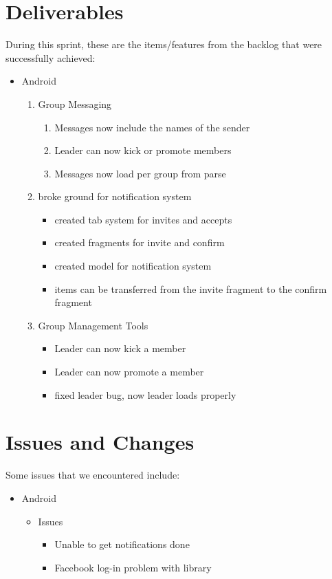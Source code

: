 \documentclass[11pt]{article}
\begin{document}
\section*{Deliverables}
During this sprint, these are the items/features from the backlog that were successfully achieved:
	\begin{itemize}
	\item Android
		\begin{enumerate}
		\item Group Messaging
			\begin{enumerate}
				\item Messages now include the names of the sender
				\item Leader can now kick or promote members
				\item Messages now load per group from parse
			\end{enumerate}
		\item broke ground for notification system
			\begin{itemize}
				\item created tab system for invites and accepts
				\item created fragments for invite and confirm
				\item created model for notification system
				\item items can be transferred from the invite fragment to the confirm fragment
			\end{itemize}
		\item Group Management Tools
			\begin{itemize}
				\item Leader can now kick a member
				\item Leader can now promote a member
				\item fixed leader bug, now leader loads properly
			\end{itemize}
		\end{enumerate}
	\end{itemize}

\section*{Issues and Changes}
Some issues that we encountered include:

	\begin{itemize}
		\item Android
			\begin{itemize}
				\item Issues
				\begin{itemize}
					\item Unable to get notifications done
					\item Facebook log-in problem with library
				\end{itemize}
			\end{itemize}
	\end{itemize}
\end{document}
